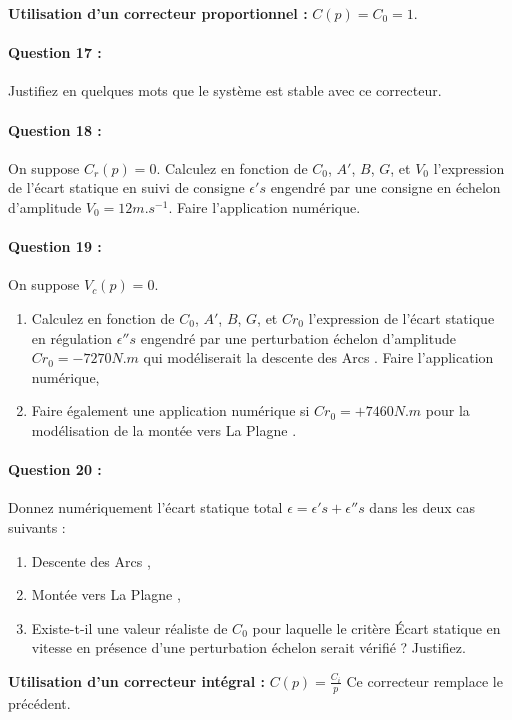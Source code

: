 \textbf{Utilisation d'un correcteur proportionnel :}   $C(p)=C_0=1$.

\paragraph{Question 17 :} Justifiez en quelques mots que le système est stable avec ce correcteur.

\paragraph{Question 18 :} On suppose $C_r(p)=0$. Calculez en fonction de $C_0$, $A'$, $B$, $G$, et $V_0$ l'expression de l'écart statique en suivi de consigne $\epsilon's$ engendré par une consigne en échelon d'amplitude $V_0=12m.s^{-1}$. Faire l'application numérique.

\paragraph{Question 19 :} On suppose $V_c(p)=0$.

\begin{enumerate}
 \item Calculez en fonction de $C_0$, $A'$, $B$, $G$, et $Cr_0$ l'expression de l'écart statique en régulation $\epsilon''s$ engendré par une perturbation échelon d'amplitude $Cr_0=-7270N.m$ qui modéliserait la descente des \og Arcs \fg. Faire l'application numérique,
 \item Faire également une application numérique si $Cr_0=+7460N.m$ pour la modélisation de la montée vers \og La Plagne \fg.
\end{enumerate}

\paragraph{Question 20 :} Donnez numériquement l'écart statique total $\epsilon=\epsilon's+\epsilon''s$  dans les deux cas suivants :
\begin{enumerate}
 \item Descente des \og Arcs \fg,
 \item Montée vers \og La Plagne \fg,
 \item Existe-t-il une valeur réaliste de $C_0$ pour laquelle le critère \og Écart statique en vitesse en présence d'une perturbation échelon \fg serait vérifié ? Justifiez.
\end{enumerate}
 
\textbf{Utilisation d'un correcteur intégral :} $C(p)=\frac{C_i}{p}$ Ce correcteur remplace le précédent.

